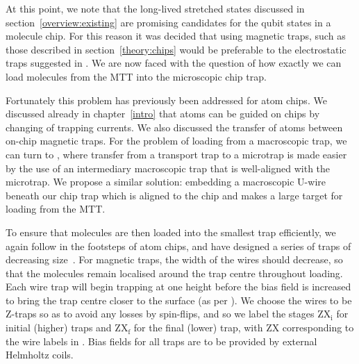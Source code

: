At this point, we note that the long-lived stretched states discussed in
section~\ref{overview:existing} are promising candidates for the qubit states
in a molecule chip. For this reason it was decided that using magnetic traps,
such as those described in section~\ref{theory:chips} would be preferable to the
electrostatic traps suggested in . We are now faced with
the question of how exactly we can load molecules from the MTT into the
microscopic chip trap.

Fortunately this problem has previously been addressed for atom chips. We
discussed already in chapter~\ref{intro} that atoms can be guided on chips by
changing of trapping currents. We also discussed the transfer of
atoms between on-chip magnetic traps. For the problem of loading from a
macroscopic trap, we can turn to , where transfer from a
transport trap to a microtrap is made easier by the use of an intermediary
macroscopic trap that is well-aligned with the microtrap.
We propose a similar solution: embedding a macroscopic U-wire beneath our chip
trap which is aligned to the chip and makes a large target for loading from the
MTT.

To ensure that molecules are then loaded into the smallest trap efficiently, we
again follow in the footsteps of atom chips, and have designed  a series of
traps of decreasing size~\cite{Reichel1999}. For magnetic traps, the width of
the wires should decrease, so that the molecules remain localised around the
trap centre throughout loading. 
%
Each wire trap will begin trapping at one height before the bias field is
increased to bring the trap centre closer to the surface (as per
). We choose the wires to be Z-traps so as to avoid
any losses by spin-flips, and so we label the stages $\mathrm{ZX_i}$ for
initial (higher) traps and $\mathrm{ZX_f}$ for the final (lower) trap, with
$\mathrm{ZX}$ corresponding to the wire labels in
. Bias fields for all traps are to be provided
by external Helmholtz coils.

